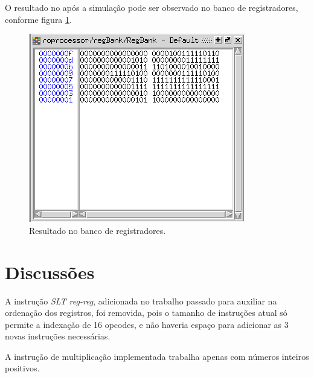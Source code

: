 \documentclass[11pt,a4paper,titlepage]{article}
\begin{document}
O resultado no após a simulação pode ser observado no banco de registradores, conforme figura \ref{fig:res}.

\begin{figure}[!h]
\centering
\includegraphics[scale=0.5]{images/res.png}
\caption{Resultado no banco de registradores.}
\label{fig:res}
\end{figure}


\section{Discussões}

A instrução \textit{SLT reg-reg}, adicionada no trabalho passado para auxiliar na ordenação dos registros, foi removida, pois o tamanho de instruções atual só permite a indexação de 16 opcodes, e não haveria espaço para adicionar as 3 novas instruções necessárias.

A instrução de multiplicação implementada trabalha apenas com números inteiros positivos.


%

\nocite{*}
\end{document}
